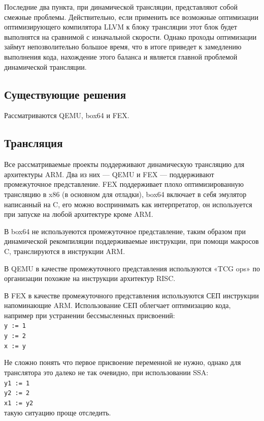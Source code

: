 Последние два пункта, при динамической трансляции, представляют собой смежные проблемы. Действительно, если применить все возможные оптимизации оптимизирующего компилятора LLVM к блоку трансляции этот блок будет выполнятся на сравнимой с изначальной скорости. Однако проходы оптимизации займут непозволительно большое время, что в итоге приведет к замедлению выполнения кода, нахождение этого баланса и является главной проблемой динамической трансляции. 

\subsection{Существующие решения}

Рассматриваются QEMU, box64 и FEX.

\subsection{Трансляция}

Все рассматриваемые проекты поддерживают динамическую трансляцию для архитектуры ARM. Два из них --- QEMU и FEX --- поддерживают промежуточное представление. FEX поддерживает плохо оптимизированную трансляцию в x86 (в основном для отладки), box64 включает в себя эмулятор написанный на C, его можно воспринимать как интерпретатор, он используется при запуске на любой архитектуре кроме ARM.

В box64 не используеются промежуточное представление, таким образом при динамической рекомпиляции поддерживаемые инструкции, при помощи макросов C, транслируются в инструкции ARM.

В QEMU в качестве промежуточного представления используются «TCG ops» по организации похожие на инструкции архитектур RISC.

В FEX в качестве промежуточного представления используются СЕП инструкции напоминающие ARM. Использование СЕП облегчает оптимизацию кода, например при устранении бессмысленных присвоений:\\
\texttt{y := 1\\
	y := 2\\
	x := y}

Не сложно понять что первое присвоение переменной не нужно, однако для транслятора это далеко не так очевидно, при использовании SSA:\\
\texttt{y1 := 1\\
	y2 := 2\\
	x1 := y2\\}
такую ситуацию проще отследить. 

